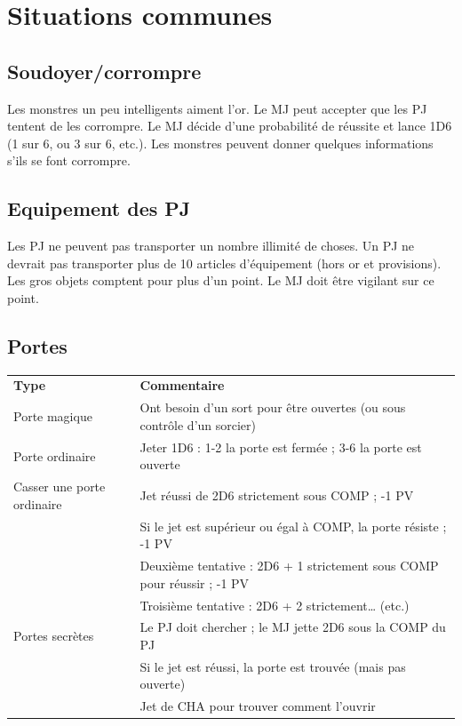 \documentclass[a4paper, 11pt, twoside]{article}
\begin{document}
\section{Situations communes}
\label{sec:orgf715a53}
\subsection{Soudoyer/corrompre}
\label{sec:orgcca7971}

Les monstres un peu intelligents aiment l'or. Le MJ peut accepter que les PJ tentent de les corrompre. Le MJ décide d'une probabilité de réussite et lance 1D6 (1 sur 6, ou 3 sur 6, etc.). Les monstres peuvent donner quelques informations s'ils se font corrompre.

\subsection{Equipement des PJ}
\label{sec:orga3ad709}

Les PJ ne peuvent pas transporter un nombre illimité de choses. Un PJ ne devrait pas transporter plus de 10 articles d'équipement (hors or et provisions). Les gros objets comptent pour plus d'un point. Le MJ doit être vigilant sur ce point.

\subsection{Portes}
\label{sec:orga76cf28}

\begin{longtable}{ll}
\textbf{Type} & \textbf{Commentaire}\\
Porte magique & Ont besoin d'un sort pour être ouvertes (ou sous contrôle d'un sorcier)\\
Porte ordinaire & Jeter 1D6 : 1-2 la porte est fermée ; 3-6 la porte est ouverte\\
Casser une porte ordinaire & Jet réussi de 2D6 strictement sous COMP ; -1 PV\\
 & Si le jet est supérieur ou égal à COMP, la porte résiste ; -1 PV\\
 & Deuxième tentative : 2D6 + 1 strictement sous COMP pour réussir ; -1 PV\\
 & Troisième tentative : 2D6 + 2 strictement\ldots{} (etc.)\\
Portes secrètes & Le PJ doit chercher ; le MJ jette 2D6 sous la COMP du PJ\\
 & Si le jet est réussi, la porte est trouvée (mais pas ouverte)\\
 & Jet de CHA pour trouver comment l'ouvrir\\
\end{longtable}
\end{document}
